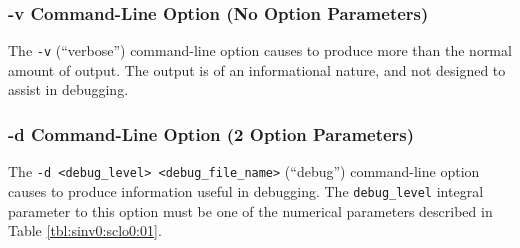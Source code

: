 \subsubsection{-v Command-Line Option (No Option Parameters)}
The \texttt{-v} (``verbose'') command-line option causes 
\swname{} to produce more than the normal 
amount of output.  The output is of an informational nature, and not 
designed to assist in debugging.

\subsubsection{-d Command-Line Option (2 Option Parameters)}
The \texttt{-d <debug\_level> <debug\_file\_name>} (``debug'') 
command-line option causes 
\swname{} to produce information 
useful in debugging.  The \texttt{debug\_level}
integral parameter to this option 
must be one of the numerical parameters described in Table 
\ref{tbl:sinv0:sclo0:01}.


